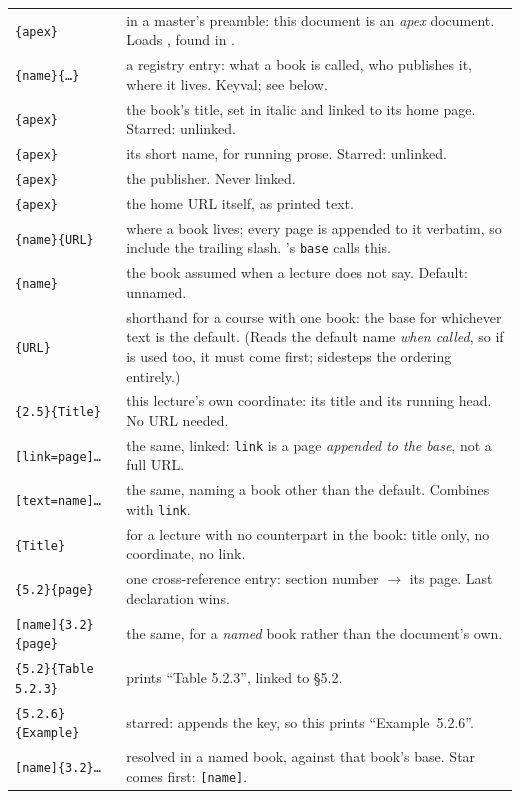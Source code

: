 \begin{center}
\begin{tabularx}{\linewidth}{@{}l Y@{}}
\texttt{\{apex\}} & in a master's preamble: this document is
  an \emph{apex} document. Loads , found in .\\
\texttt{\{name\}\{\dots\}} & a registry entry: what a book
  is called, who publishes it, where it lives. Keyval; see below.\\
\texttt{\{apex\}} & the book's title, set in italic and
  linked to its home page. Starred: unlinked.\\
\texttt{\{apex\}} & its short name, for running prose.
  Starred: unlinked.\\
\texttt{\{apex\}} & the publisher. Never linked.\\
\texttt{\{apex\}} & the home URL itself, as printed text.\\
\texttt{\{name\}\{URL\}} & where a book lives; every
  page is appended to it verbatim, so include the trailing slash.
  's \texttt{base} calls this.\\
\texttt{\{name\}} & the book assumed when a lecture
  does not say. Default: unnamed.\\
\texttt{\{URL\}} & shorthand for a course with one book:
  the base for whichever text is the default. (Reads the default name
  \emph{when called}, so if  is used too, it must come
  first;  sidesteps the ordering entirely.)\\
\texttt{\{2.5\}\{Title\}} & this lecture's own
  coordinate: its title and its running head. No URL needed.\\
\texttt{[link=page]\dots} & the same, linked:
  \texttt{link} is a page \emph{appended to the base}, not a full URL.\\
\texttt{[text=name]\dots} & the same, naming a book other
  than the default. Combines with \texttt{link}.\\
\texttt{\{Title\}} & for a lecture with no counterpart
  in the book: title only, no coordinate, no link.\\
\texttt{\{5.2\}\{page\}} & one cross-reference entry:
  section number $\to$ its page. Last declaration wins.\\
\texttt{[name]\{3.2\}\{page\}} & the same, for a
  \emph{named} book rather than the document's own.\\
\texttt{\{5.2\}\{Table 5.2.3\}} & prints
  ``Table 5.2.3'', linked to \S5.2.\\
\texttt{\{5.2.6\}\{Example\}} & starred: appends the key,
  so this prints ``Example~5.2.6''.\\
\texttt{[name]\{3.2\}\dots} & resolved in a named book,
  against that book's base. Star comes first: \texttt{[name]}.\\
\end{tabularx}
\end{center}

